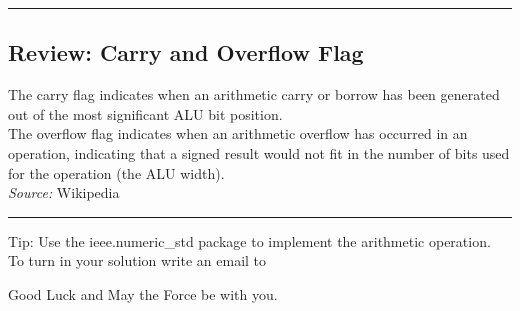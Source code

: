 \documentclass[a4paper,12pt]{article}
\begin{document}
\rule{16cm}{0.4pt}\par
 \subsection*{Review: Carry and Overflow Flag}
The carry flag indicates when an arithmetic carry or borrow has been generated out of the most significant ALU bit position. \\

The overflow flag indicates when an arithmetic overflow has occurred in an operation, indicating that a signed result would not fit in the number of bits used for the operation (the ALU width).\\


\textit{Source: }Wikipedia
\\
\rule{16cm}{0.4pt}

\vspace{0.3cm}

Tip: Use the ieee.numeric\_std package to implement the arithmetic operation.
\\

To turn in your solution write an email to %

\vspace{0.7cm}
Good Luck and May the Force be with you.
\end{document}
